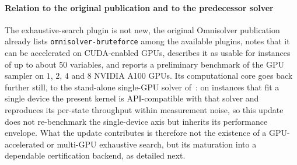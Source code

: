 \documentclass[12pt,a4paper]{elsarticle}
\begin{document}
\paragraph{Relation to the original publication and to the predecessor solver}
The exhaustive-search plugin is not new, the original Omnisolver
publication~\cite{jalowiecki2021omnisolver} already lists
\texttt{omnisolver-bruteforce} among the available plugins, notes that it can be
accelerated on CUDA-enabled GPUs, describes it as usable for instances of up to
about $50$ variables, and reports a preliminary benchmark of the GPU sampler on
$1$, $2$, $4$ and $8$ NVIDIA A100 GPUs. Its computational core goes back further
still, to the stand-alone single-GPU solver of~\cite{jalowiecki2021brute}: on
instances that fit a single device the present kernel is API-compatible with
that solver and reproduces its per-state throughput within measurement noise, so
this update does not re-benchmark the single-device axis but inherits its
performance envelope. What the update contributes is therefore not the existence
of a GPU-accelerated or multi-GPU exhaustive search, but its maturation into a
dependable certification backend, as detailed next.
\end{document}
